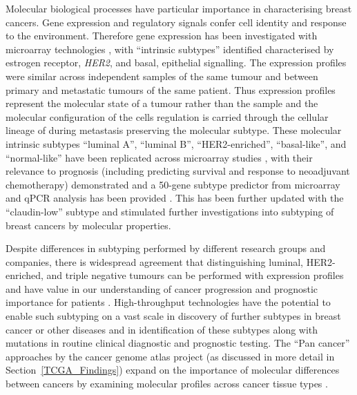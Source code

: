 Molecular biological processes have particular importance in characterising breast cancers. Gene expression and regulatory signals confer cell identity and response to the environment. Therefore gene expression has been investigated with microarray technologies \citet{Perou2000}, with ``intrinsic subtypes'' identified characterised by estrogen receptor, \textit{HER2}, and basal, epithelial signalling. The expression profiles were similar across independent samples of the same tumour and  between primary and metastatic tumours of the same patient. Thus expression profiles represent the molecular state of a tumour rather than the sample and the molecular configuration of the cells regulation is carried through the cellular lineage of during metastasis preserving the molecular subtype. These molecular intrinsic subtypes ``luminal A'', ``luminal B'', ``HER2-enriched'', ``basal-like'', and ``normal-like'' have been replicated across microarray studies \citep{Hu2006}, with their relevance to prognosis (including predicting survival and response to neoadjuvant chemotherapy) demonstrated and a 50-gene subtype predictor from microarray and \gls{qPCR} analysis has been provided \citep{Sorlie2001, Parker2009}. This has been further updated with the ``claudin-low'' subtype \citep{Herschkowitz2007} and stimulated further investigations into subtyping of breast cancers by molecular properties.

Despite differences in subtyping performed by different research groups and companies, there is widespread agreement that distinguishing luminal, HER2-enriched, and triple negative tumours can be performed with expression profiles and have value in our understanding of cancer progression and prognostic importance for patients \citet{Dai2015}. High-throughput technologies have the potential to enable such subtyping on a vast scale in discovery of further subtypes in breast cancer or other diseases and in identification of these subtypes along with mutations in routine clinical diagnostic and prognostic testing. The ``Pan cancer'' approaches by the cancer genome atlas project (as discussed in more detail in Section~\ref{TCGA_Findings}) expand on the importance of molecular differences between cancers by examining molecular profiles across cancer tissue types \citep{TCGA2013PAN}.

